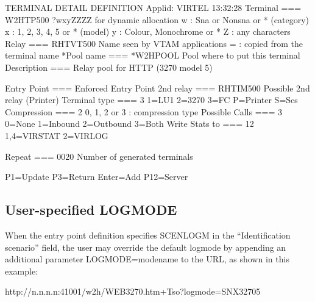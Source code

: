\documentclass[letterpaper,10pt,english]{sphinxmanual}
\begin{document}
\begin{sphinxVerbatim}[commandchars=\\\{\}]
TERMINAL DETAIL DEFINITION \PYGZhy{}\PYGZhy{}\PYGZhy{}\PYGZhy{}\PYGZhy{}\PYGZhy{}\PYGZhy{}\PYGZhy{}\PYGZhy{}\PYGZhy{}\PYGZhy{}\PYGZhy{}\PYGZhy{}\PYGZhy{}\PYGZhy{}\PYGZhy{}\PYGZhy{}\PYGZhy{}\PYGZhy{}\PYGZhy{}\PYGZhy{}\PYGZhy{}\PYGZhy{}\PYGZhy{}\PYGZhy{} Applid: VIRTEL 13:32:28
Terminal          ===\PYGZgt{} W2HTP500       ?wxyZZZZ for dynamic allocation
                                      w : Sna or Non\PYGZhy{}sna or * (category)
                                      x : 1, 2, 3, 4, 5 or * (model)
                                      y : Colour, Monochrome or *
                                      Z : any characters
Relay             ===\PYGZgt{} RHTVT500 Name seen by VTAM applications
                                      = : copied from the terminal name
*Pool name        ===\PYGZgt{} *W2HPOOL       Pool where to put this terminal
Description       ===\PYGZgt{} Relay pool for HTTP (3270 model 5)

Entry Point       ===\PYGZgt{}                Enforced Entry Point
2nd relay         ===\PYGZgt{} RHTIM500       Possible 2nd relay (Printer)
Terminal type     ===\PYGZgt{} 3              1=LU1 2=3270 3=FC P=Printer S=Scs
Compression       ===\PYGZgt{} 2              0, 1, 2 or 3 : compression type
Possible Calls    ===\PYGZgt{} 3              0=None 1=Inbound 2=Outbound 3=Both
Write Stats to ===\PYGZgt{} 12                1,4=VIRSTAT 2=VIRLOG

Repeat ===\PYGZgt{} 0020 Number of generated terminals

P1=Update                         P3=Return                         Enter=Add
                                                                    P12=Server
\end{sphinxVerbatim}



\subsection{User-specified LOGMODE}
\label{\detokenize{User_Guide:user-specified-logmode}}
When the entry point definition specifies SCENLOGM in the “Identification scenario” field, the user may override the
default logmode by appending an additional parameter LOGMODE=modename to the URL, as shown in this example:

\begin{sphinxVerbatim}[commandchars=\\\{\}]
http://n.n.n.n:41001/w2h/WEB3270.htm+Tso?logmode=SNX32705
\end{sphinxVerbatim}
\end{document}
